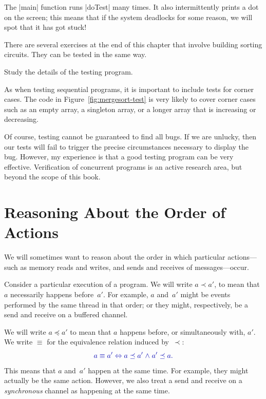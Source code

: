 The |main| function  runs |doTest| many times.
%
It also intermittently prints a dot on the screen; this means that if the
system deadlocks for some reason, we will spot that it has got stuck!

There are several exercises at the end of this chapter that involve building
sorting circuits.  They can be tested in the same way.
%
\begin{instruction}
Study the details of the testing program.
\end{instruction}

As when testing sequential programs, it is important to include tests for
corner cases.  The code in Figure~\ref{fig:mergesort-test} is very likely to
cover corner cases such as an empty array, a singleton array, or a longer
array that is increasing or decreasing.

Of course, testing cannot be guaranteed to find all bugs.  If we are unlucky,
then our tests will fail to trigger the precise circumstances necessary to
display the bug.  However, my experience is that a good testing program can be
very effective.  Verification of concurrent programs is an active research
area, but beyond the scope of this book.
 


\section{Reasoning About the Order of Actions}

We will sometimes want to reason about the order in which particular
actions---such as memory reads and writes, and sends and receives of
messages---occur.

Consider a particular execution of a program.  We will write $a \prec a'$, to
mean that $a$ necessarily happens 
before~$a'$.  For example, $a$ and~$a'$ might
be events performed by 
the same thread in that order; or they might, respectively, be a send and
receive on a buffered channel.

We will write $a \preceq a'$ to mean that $a$ happens before, or
simultaneously with, $a'$.  
%
We write $\equiv$ for the equivalence relation induced by~$\prec$:
\[\mstyle
a \equiv a' \iff a \preceq a' \land a' \preceq a.
\]
This means that $a$ and~$a'$ happen at the same time.  For example, they might
actually be the same action.  However, we also treat a send and receive on a
\emph{synchronous} channel as happening at the same time.

